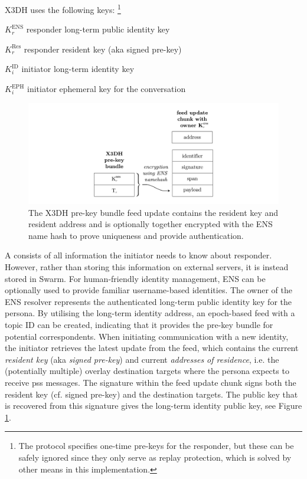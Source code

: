X3DH uses the following keys:%
%
\footnote{The protocol specifies one-time pre-keys for the responder, but these can be safely ignored since they only serve as replay protection, which is solved by other means in this implementation.}

\begin{labelledlist}
\item[$K^{\mathrm{ENS}}_r$] responder long-term public identity key
\item[$K^{\mathrm{Res}}_r$] responder resident key (aka signed pre-key)
\item[$K^{\mathrm{ID}}_i$] initiator long-term identity key
\item[$K^{\mathrm{EPH}}_i$] initiator ephemeral key for the conversation
\end{labelledlist}



\begin{figure}[htbp]
   \centering
   \includegraphics[width=\textwidth]{fig/prekey-bundle-feed-update.pdf}
   \caption[X3DH pre-key bundle feed update \statusgreen]{The X3DH pre-key bundle feed update contains the resident key and resident address and is optionally together encrypted with the ENS name hash to prove uniqueness and provide authentication.}
\label{fig:prekey-bundle-feed-update}
\end{figure}


A  consists of all information the initiator needs to know about responder. However, rather than storing this information on external servers, it is instead stored in Swarm. For human-friendly identity management, ENS can be optionally used to provide familiar username-based identities. The owner of the ENS resolver represents the authenticated long-term public identity key for the persona. By utilising the long-term identity address, an epoch-based feed with a topic ID can be created, indicating that it provides the pre-key bundle for potential correspondents. When initiating communication with a new identity, the initiator retrieves the latest update from the feed, which contains the current \emph{resident key} (aka \emph{signed pre-key}) and current \emph{addresses of residence}, i.e. the (potentially multiple) overlay destination targets where the persona expects to receive pss messages. The signature within the feed update chunk signs both the resident key (cf. signed pre-key) and the destination targets. The public key that is recovered from this signature gives the long-term identity public key, see Figure \ref{fig:prekey-bundle-feed-update}.


